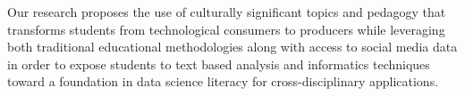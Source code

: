 Our research proposes the use of culturally significant topics and pedagogy that transforms students from technological consumers to producers while leveraging both traditional educational methodologies along with access to social media data in order to expose students to text based analysis and informatics techniques toward a foundation in data science literacy for cross-disciplinary applications.
